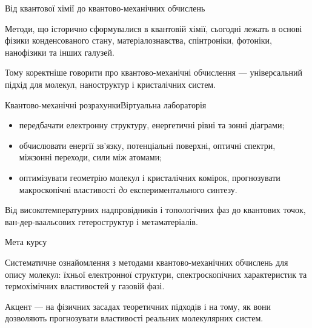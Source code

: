 \documentclass[10pt]{beamer}
\begin{document}
\begin{frame}{Від квантової хімії до квантово-механічних обчислень}{}
\begin{block}{}\justifying
    Методи, що історично сформувалися в квантовій хімії, сьогодні лежать в основі \alert{фізики конденсованого стану, матеріалознавства, спінтроніки, фотоніки, нанофізики} та інших галузей.
\end{block}

\begin{alertblock}{}\centering
    Тому коректніше говорити про \alert{квантово-механічні обчислення} --- універсальний підхід для молекул, наноструктур і кристалічних систем.
\end{alertblock}
\end{frame}

\begin{frame}{Квантово-механічні розрахунки}{Віртуальна лабораторія}
\begin{itemize}\justifying
    \item передбачати електронну структуру, енергетичні рівні та зонні діаграми;
    \item обчислювати енергії зв'язку, потенціальні поверхні, оптичні спектри, міжзонні переходи, сили між атомами;
    \item оптимізувати геометрію молекул і кристалічних комірок, прогнозувати макроскопічні властивості \emph{до} експериментального синтезу.
\end{itemize}

\begin{block}{}\centering\justifying
    Від високотемпературних надпровідників і топологічних фаз до квантових точок, ван-дер-ваальсових гетероструктур і метаматеріалів.
\end{block}
\end{frame}

\begin{frame}{Мета курсу}{}
\begin{block}{}\justifying
    Систематичне ознайомлення з методами \alert{квантово-механічних обчислень} для опису молекул: їхньої електронної структури, спектроскопічних характеристик та термохімічних властивостей у \alert{газовій фазі}.
\end{block}

\begin{alertblock}{}\centering
    Акцент --- на фізичних засадах теоретичних підходів і на тому, як вони дозволяють прогнозувати властивості реальних молекулярних систем.
\end{alertblock}
\end{frame}
\end{document}
